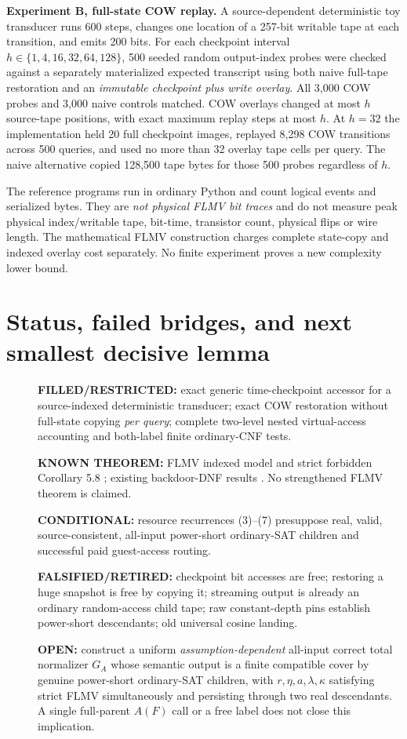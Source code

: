 \documentclass[11pt]{article}
\begin{document}
\textbf{Experiment B, full-state COW replay.}
A source-dependent deterministic toy transducer runs 600 steps,
changes one location of a 257-bit writable tape at each transition,
and emits 200 bits. For each checkpoint interval
$h\in\{1,4,16,32,64,128\}$,
500 seeded random output-index probes were checked against a
separately materialized expected transcript using both naive full-tape
restoration and an \emph{immutable checkpoint plus write overlay}.
All 3,000 COW probes and 3,000 naive controls matched.
COW overlays changed at most $h$ source-tape positions, with exact
maximum replay steps at most $h$. At $h=32$ the implementation held
20 full checkpoint images, replayed 8,298 COW transitions across
500 queries, and used no more than 32 overlay tape cells per query.
The naive alternative copied 128,500 tape bytes for those 500 probes
regardless of $h$.

The reference programs run in ordinary Python and count logical
events and serialized bytes. They are \emph{not physical FLMV bit
traces} and do not measure peak physical index/writable tape,
bit-time, transistor count, physical flips or wire length.
The mathematical FLMV construction charges complete state-copy
and indexed overlay cost separately. No finite experiment proves a
new complexity lower bound.

\section{Status, failed bridges, and next smallest decisive lemma}
\begin{description}
\item[] \textbf{FILLED/RESTRICTED:} exact generic time-checkpoint accessor
for a source-indexed deterministic transducer; exact COW restoration
without full-state copying \emph{per query}; complete two-level nested
virtual-access accounting and both-label finite ordinary-CNF tests.
\item[] \textbf{KNOWN THEOREM:} FLMV indexed model and strict
forbidden Corollary 5.8 \cite{FLMV}; existing backdoor-DNF results
\cite{BackdoorDNF}. No strengthened FLMV theorem is claimed.
\item[] \textbf{CONDITIONAL:} resource recurrences (3)--(7) presuppose
real, valid, source-consistent, all-input power-short ordinary-SAT
children and successful paid guest-access routing.
\item[] \textbf{FALSIFIED/RETIRED:} checkpoint bit accesses are free;
restoring a huge snapshot is free by copying it; streaming output
is already an ordinary random-access child tape; raw constant-depth
pins establish power-short descendants; old universal cosine landing.
\item[] \textbf{OPEN:} construct a uniform \emph{assumption-dependent}
all-input correct total normalizer $G_A$ whose semantic output is a
finite compatible cover by genuine power-short ordinary-SAT children,
with $r,\eta,a,\lambda,\kappa$ satisfying strict FLMV simultaneously
and persisting through two real descendants. A single full-parent
$A(F)$ call or a free label does not close this implication.
\end{description}
\end{document}
